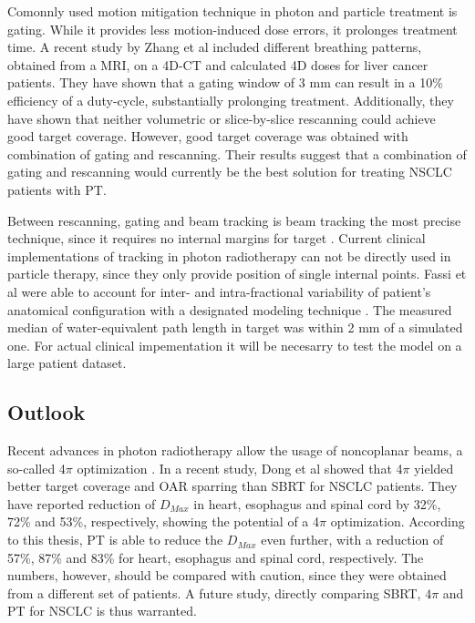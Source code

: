 \documentclass[type=dr, dr=rernat, accentcolor=tud7b,colorbacktitle, bigchapter, openright, twoside, 12pt ]{tudthesis}
\begin{document}
Comonnly used motion mitigation technique in photon and particle treatment is gating. While it provides less motion-induced dose errors, it prolonges treatment time.
A recent study by Zhang et al \cite{Zhang2015} included 
different breathing patterns, obtained from a MRI, on a 4D-CT and calculated 4D doses for liver cancer patients. They have shown that a gating window of 3 mm can result
in a 10\% efficiency of a duty-cycle, 
substantially prolonging treatment. Additionally, they have shown that neither volumetric or slice-by-slice rescanning could achieve good target coverage.
However, good target coverage was obtained with combination
of gating and rescanning. Their results suggest that a combination of gating and rescanning would currently be the best solution for treating NSCLC patients with PT.

Between rescanning, gating and beam tracking is beam tracking the most precise technique, since it requires no internal margins for target \cite{Bert2011}. 
Current clinical implementations of tracking in photon radiotherapy \cite{Kilby2010, Keall2014} can not be directly used in particle therapy, 
since they only provide position of single internal points. Fassi et al 
\cite{Fassi2015} were able to account for inter- and intra-fractional variability of patient's anatomical configuration with a designated modeling technique \cite{Fassi2014}.
The measured median of water-equivalent path length in target was within 2 mm of a simulated one. For actual clinical impementation it will be necesarry to test the model
on a large patient dataset.


\subsection{Outlook}

Recent advances in photon radiotherapy allow the usage of noncoplanar beams, a so-called 4$\pi$ optimization \cite{Dong2013}. In a recent study, Dong et al \cite{Dong2013b} showed that
4$\pi$ yielded better target coverage and OAR sparring than SBRT for NSCLC patients. 
They have reported reduction of $D_{Max}$ in heart, esophagus and spinal cord by 32\%, 72\% and 53\%, respectively, showing
the potential of a 4$\pi$ optimization. According to this thesis, PT is able to reduce the $D_{Max}$ even further, with a reduction of 57\%, 87\% and 83\% for heart, esophagus and spinal cord,
respectively. The numbers, however, should be compared with caution, since they were obtained from a different set of patients. 
A future study, directly comparing SBRT, $4\pi$ and PT for NSCLC is thus warranted.
\end{document}
